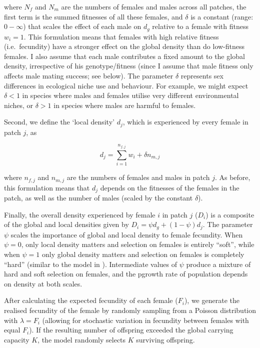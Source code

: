 \documentclass[]{rsos}%
\begin{document}
where \(N_f\) and \(N_m\) are the numbers of females and males across
all patches, the first term is the summed fitnesses of all these
females, and \(\delta\) is a constant (range: \(0-\infty\)) that scales
the effect of each male on \(d_g\) relative to a female with fitness
\(w_i = 1\). This formulation means that females with high relative
fitness (i.e.~fecundity) have a stronger effect on the global density
than do low-fitness females. I also assume that each male contributes a
fixed amount to the global density, irrespective of his genotype/fitness
(since I assume that male fitness only affects male mating success; see
below). The parameter \(\delta\) represents sex differences in
ecological niche use and behaviour. For example, we might expect
\(\delta<1\) in species where males and females utilise very different
environmental niches, or \(\delta>1\) in species where males are harmful
to females.

Second, we define the `local density' \(d_j\), which is experienced by
every female in patch \(j\), as

\[d_j = \sum_{i=1}^{n_{f,j}} w_i + \delta n_{m,j}\]

where \(n_{f,j}\) and \(n_{m,j}\) are the numbers of females and males
in patch \(j\). As before, this formulation means that \(d_j\) depends
on the fitnesses of the females in the patch, as well as the number of
males (scaled by the constant \(\delta\)).

Finally, the overall density experienced by female \(i\) in patch \(j\)
(\(D_i\)) is a composite of the global and local densities given by
\(D_i = \psi d_g + (1 - \psi)d_j\). The parameter \(\psi\) scales the
importance of global and local density to female fecundity. When
\(\psi = 0\), only local density matters and selection on females is
entirely ``soft'', while when \(\psi = 1\) only global density matters
and selection on females is completely ``hard'' (similar to the model in
\citep{li2018ev}). Intermediate values of \(\psi\) produce a mixture of
hard and soft selection on females, and the pgrowth rate of population
depends on density at both scales.

After calculating the expected fecundity of each female (\(F_i\)), we
generate the realised fecundity of the female by randomly sampling from
a Poisson distribution with \(\lambda = F_i\) (allowing for stochastic
variation in fecundity between females with equal \(F_i\)). If the
resulting number of offspring exceeded the global carrying capacity
\(K\), the model randomly selects \(K\) surviving offspring.
\end{document}
